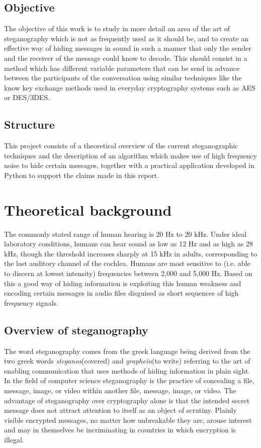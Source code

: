 \documentclass[12pt]{report}
\begin{document}
\section{Objective}
The objective of this work is to study in more detail an area of the art of steganography which is not as frequently used as it should be, and to create an effective way of hiding messages in sound in such a manner that only the sender and the receiver of the message could know to decode. This should consist in a method which has different variable parameters that can be send in advance between the participants of the conversation using similar techniques like the know key exchange methods used in everyday cryptography systems such as AES or DES/3DES. 
\section{Structure}
This project consists of a theoretical overview of the current steganographic techniques and the description of an algorithm which makes use of high frequency noise to hide certain messages, together with a practical application developed in Python to support the claims made in this report. 



\chapter{Theoretical background}

The commonly stated range of human hearing is 20 Hz to 20 kHz. Under ideal laboratory conditions, humans can hear sound as low as 12 Hz and as high as 28 kHz, though the threshold increases sharply at 15 kHz in adults, corresponding to the last auditory channel of the cochlea. Humans are most sensitive to (i.e. able to discern at lowest intensity) frequencies between 2,000 and 5,000 Hz. Based on this a good way of hiding information is exploiting this human weakness and encoding certain messages in audio files disguised as short sequences of high frequency signals.




\section{Overview of steganography}
The word steganography comes from the greek language being derived from the two greek words \emph{steganos}(covered) and \emph{graphein}(to write) referring to the art of enabling communication that uses methods of hiding information in plain sight. In the field of computer science steganography is the practice of concealing a file, message, image, or video within another file, message, image, or video.
The advantage of steganography over cryptography alone is that the intended secret message does not attract attention to itself as an object of scrutiny. Plainly visible encrypted messages, no matter how unbreakable they are, arouse interest and may in themselves be incriminating in countries in which encryption is illegal.\cite{note4}
\end{document}
